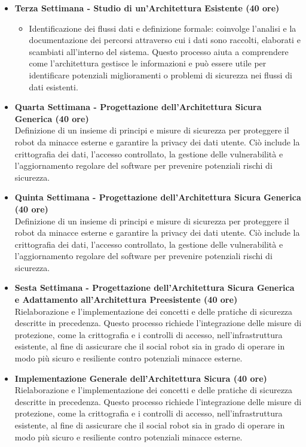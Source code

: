 {\begin{itemize}
        \item \textbf{Terza Settimana - Studio di un'Architettura Esistente (40 ore)}
        \begin{itemize}
            \item Identificazione dei flussi dati e definizione formale: coinvolge l'analisi e la documentazione dei percorsi attraverso cui i dati sono raccolti, elaborati e scambiati all'interno del sistema. Questo processo aiuta a comprendere come l'architettura gestisce le informazioni e può essere utile per identificare potenziali miglioramenti o problemi di sicurezza nei flussi di dati esistenti.
        \end{itemize}
        \item \textbf{Quarta Settimana - Progettazione dell'Architettura Sicura Generica (40 ore)} \\ Definizione di un insieme di principi e misure di sicurezza per proteggere il robot da minacce esterne e garantire la privacy dei dati utente. Ciò include la crittografia dei dati, l'accesso controllato, la gestione delle vulnerabilità e l'aggiornamento regolare del software per prevenire potenziali rischi di sicurezza.
        \item \textbf{Quinta Settimana - Progettazione dell'Architettura Sicura Generica (40 ore)} \\ Definizione di un insieme di principi e misure di sicurezza per proteggere il robot da minacce esterne e garantire la privacy dei dati utente. Ciò include la crittografia dei dati, l'accesso controllato, la gestione delle vulnerabilità e l'aggiornamento regolare del software per prevenire potenziali rischi di sicurezza.
        \item \textbf{Sesta Settimana - Progettazione dell'Architettura Sicura Generica e Adattamento all'Architettura Preesistente (40 ore)} \\ Rielaborazione e l'implementazione dei concetti e delle pratiche di sicurezza descritte in precedenza. Questo processo richiede l'integrazione delle misure di protezione, come la crittografia e i controlli di accesso, nell'infrastruttura esistente, al fine di assicurare che il social robot sia in grado di operare in modo più sicuro e resiliente contro potenziali minacce esterne.
        \item \textbf{Implementazione Generale dell'Architettura Sicura (40 ore)} \\ Rielaborazione e l'implementazione dei concetti e delle pratiche di sicurezza descritte in precedenza. Questo processo richiede l'integrazione delle misure di protezione, come la crittografia e i controlli di accesso, nell'infrastruttura esistente, al fine di assicurare che il social robot sia in grado di operare in modo più sicuro e resiliente contro potenziali minacce esterne.

\end{itemize}}
